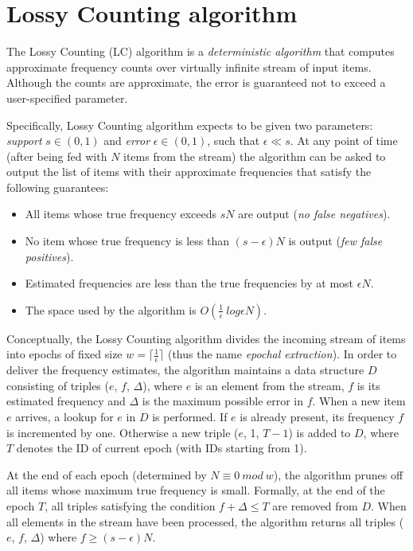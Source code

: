 \chapter{Lossy Counting algorithm}
\label{chap:lossy-counting}

The Lossy Counting (LC) algorithm \citep{manku:lossycounting} is a \emph{deterministic algorithm}
that computes approximate frequency counts over virtually infinite stream of input items.
Although the counts are approximate, the error is guaranteed not to exceed a user-specified parameter.

Specifically, Lossy Counting algorithm expects to be given two parameters:
\emph{support} $s \in (0,1)$ and \emph{error} $\epsilon \in (0,1)$, such that $\epsilon \ll s$.
At any point of time (after being fed with $N$ items from the stream) the algorithm can be
asked to output the list of items with their approximate frequencies that satisfy the following guarantees:
\begin{itemize}
 \item All items whose true frequency exceeds $sN$ are output (\emph{no false negatives}).
 \item No item whose true frequency is less than $(s - \epsilon)N$ is output (\emph{few false positives}).
 \item Estimated frequencies are less than the true frequencies by at most $\epsilon N$.
 \item The space used by the algorithm is $O(\frac{1}{\epsilon}~log \epsilon N)$.
\end{itemize}


Conceptually, the Lossy Counting algorithm divides the incoming stream of items
into epochs of fixed size $w = \lceil \frac{1}{\epsilon} \rceil$
(thus the name \emph{epochal extraction}).
In order to deliver the frequency estimates, the algorithm maintains a data structure $D$
consisting of triples ($e$, $f$, $\Delta$), where $e$ is an element from the
stream, $f$ is its estimated frequency and $\Delta$ is the maximum possible
error in $f$. When a new item $e$ arrives, a lookup for $e$ in $D$ is
performed. If $e$ is already present, its frequency $f$ is incremented by one.
Otherwise a new triple ($e$, 1, $T-1$) is added to $D$, where $T$ denotes the
ID of current epoch (with IDs starting from 1).

At the end of each epoch (determined by $N \equiv 0~mod~w$), the algorithm
prunes off all items whose maximum true frequency is small. Formally, at the end
of the epoch $T$, all triples satisfying the condition $f + \Delta \leqslant T$ are
removed from $D$. When all elements in the stream have been processed, the
algorithm returns all triples ($e$, $f$, $\Delta$) where $f \geq
(s-\epsilon)N$.

